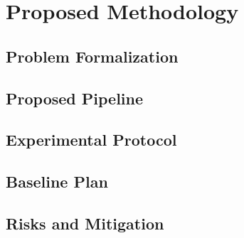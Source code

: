 \section{Proposed Methodology}
\label{sec:methodology}

\subsection{Problem Formalization}

\subsection{Proposed Pipeline}

\subsection{Experimental Protocol}

\subsection{Baseline Plan}

\subsection{Risks and Mitigation}
